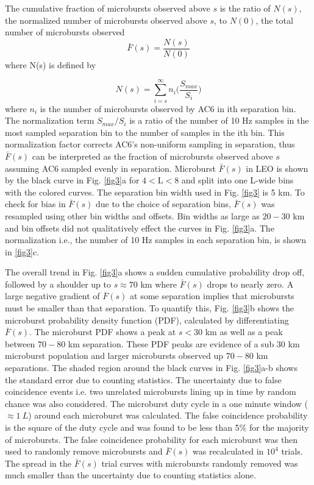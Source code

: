 The cumulative fraction of microbursts observed above $s$ is the ratio of $N(s)$, the normalized number of microbursts observed above $s$, to $N(0)$, the total number of microbursts observed 
\begin{equation}
\bar{F}(s) = \frac{N(s)}{N(0)}
\end{equation} where N(s) is defined by

\begin{equation}
N(s) = \sum_{i = s}^\infty n_{i} \Big( \frac{S_{max}}{S_{i}} \Big)
\end{equation} where $n_{i}$ is the number of microbursts observed by AC6 in ith separation bin. The normalization term $S_{max}/S_{i}$ is a ratio of the number of 10 Hz samples in the most sampled separation bin to the number of samples in the ith bin. This normalization factor corrects AC6's non-uniform sampling in separation, thus $\bar{F}(s)$ can be interpreted as the fraction of microbursts observed above $s$ assuming AC6 sampled evenly in separation. Microburst $\bar{F}(s)$ in LEO is shown by the black curve in Fig. \ref{fig3}a for $4 < \mathrm{L}< 8$ and split into one L-wide bins with the colored curves. The separation bin width used in Fig. \ref{fig3} is 5 km. To check for bias in $\bar{F}(s)$ due to the choice of separation bins, $\bar{F}(s)$ was resampled using other bin widths and offsets. Bin widths as large as $20-30$ km and bin offsets did not qualitatively effect the curves in Fig. \ref{fig3}a. The normalization i.e., the number of 10 Hz samples in each separation bin, is shown in \ref{fig3}c.

The overall trend in Fig. \ref{fig3}a shows a sudden cumulative probability drop off, followed by a shoulder up to $s \approx 70$ km where $\bar{F}(s)$ drops to nearly zero. A large negative gradient of $\bar{F}(s)$ at some separation implies that microbursts must be smaller than that separation. To quantify this, Fig. \ref{fig3}b shows the microburst probability density function (PDF), calculated by differentiating $\bar{F}(s)$. The microburst PDF shows a peak at $s < 30$ km as well as a peak between $70-80$ km separation. These PDF peaks are evidence of a sub $30$ km microburst population and larger microbursts observed up $70-80$ km separations. The shaded region around the black curves in Fig. \ref{fig3}a-b shows the standard error due to counting statistics. The uncertainty due to false coincidence events i.e. two unrelated microbursts lining up in time by random chance was also considered. The microburst duty cycle in a one minute window ($\approx 1 \ L$) around each microburst was calculated. The false coincidence probability is the square of the duty cycle and was found to be less than 5\% for the majority of microbursts. The false coincidence probability for each microburst was then used to randomly remove microbursts and $\bar{F}(s)$ was recalculated in $10^4$ trials. The spread in the $\bar{F}(s)$ trial curves with microbursts randomly removed was much smaller than the uncertainty due to counting statistics alone.

